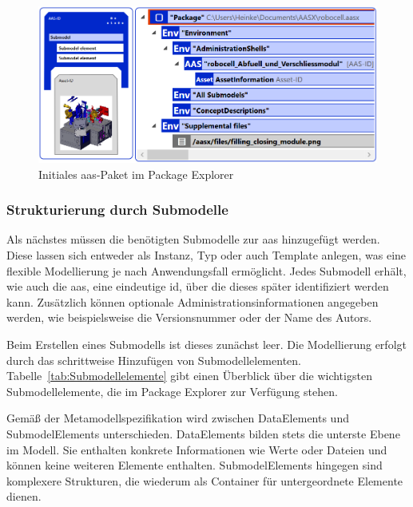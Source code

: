\begin{figure}[htbp]
    \centering
    \includegraphics[width=\textwidth]{Bilder/ModellierungAAS/Final/AASPaketPackageExplorer.PNG}
    \caption[Initiales \acs{aas}-Paket im Package Explorer]{Initiales \acs{aas}-Paket im Package Explorer}
    \label{fig:NeuesAASPaket}
\end{figure}



\subsubsection*{Strukturierung durch Submodelle}
\vspace{-0.5em}

Als nächstes müssen die benötigten Submodelle zur \acs{aas} hinzugefügt werden.
Diese lassen sich entweder als Instanz, Typ oder auch Template anlegen, was eine flexible Modellierung je nach Anwendungsfall ermöglicht.
Jedes Submodell erhält, wie auch die \acs{aas}, eine eindeutige \acs{id}, über die dieses später identifiziert werden kann.
Zusätzlich können optionale Administrationsinformationen angegeben werden, wie beispielsweise die Versionsnummer oder der Name des Autors.

Beim Erstellen eines Submodells ist dieses zunächst leer. 
Die Modellierung erfolgt durch das schrittweise Hinzufügen von Submodellelementen.
Tabelle~\ref{tab:Submodellelemente} gibt einen Überblick über die wichtigsten Submodellelemente, die im Package Explorer zur Verfügung stehen.


\vspace{-0.5em}

Gemäß der Metamodellspezifikation \cite{SpezifikationPart1} wird zwischen DataElements und SubmodelElements unterschieden.
DataElements bilden stets die unterste Ebene im Modell. Sie enthalten konkrete Informationen wie Werte oder Dateien und können keine weiteren Elemente enthalten.
SubmodelElements hingegen sind komplexere Strukturen, die wiederum als Container für untergeordnete Elemente dienen.

